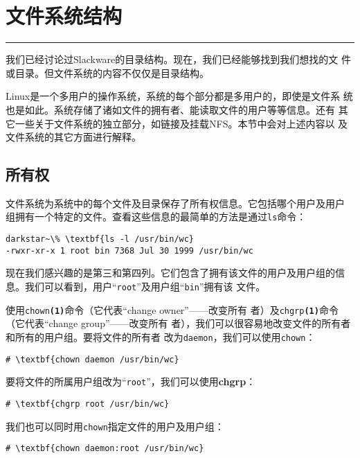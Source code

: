 
\chapter{文件系统结构}
\label{chap:filesystemStructure}

\rule{\textwidth}{0.1pt}

我们已经讨论过Slackware的目录结构。现在，我们已经能够找到我们想找的文
件或目录。但文件系统的内容不仅仅是目录结构。

Linux是一个多用户的操作系统，系统的每个部分都是多用户的，即使是文件系
统也是如此。系统存储了诸如文件的拥有者、能读取文件的用户等等信息。还有
其它一些关于文件系统的独立部分，如链接及挂载NFS。本节中会对上述内容以
及文件系统的其它方面进行解释。

\section{所有权}
\label{sec:filesystemStructure:owenership}
文件系统为系统中的每个文件及目录保存了所有权信息。它包括哪个用户及用户
组拥有一个特定的文件。查看这些信息的最简单的方法是通过\texttt{ls}命令：
\begin{Verbatim}[frame=single, commandchars=\\\{\}]
darkstar~\% \textbf{ls -l /usr/bin/wc}
-rwxr-xr-x 1 root bin 7368 Jul 30 1999 /usr/bin/wc
\end{Verbatim}
现在我们感兴趣的是第三和第四列。它们包含了拥有该文件的用户及用户组的信
息。我们可以看到，用户``\texttt{root}''及用户组``\texttt{bin}''拥有该
文件。

使用\texttt{chown\textbf{(1)}}命令（它代表``change owner''——改变所有
者）及\texttt{chgrp\textbf{(1)}}命令（它代表``change group''——改变所有
者），我们可以很容易地改变文件的所有者和所有的用户组。要将文件的所有者
改为\texttt{daemon}，我们可以使用\texttt{chown}：
\begin{Verbatim}[frame=single, commandchars=\\\{\}]
# \textbf{chown daemon /usr/bin/wc}
\end{Verbatim}
要将文件的所属用户组改为``\texttt{root}''，我们可以使用\textbf{chgrp}：
\begin{Verbatim}[frame=single, commandchars=\\\{\}]
# \textbf{chgrp root /usr/bin/wc}
\end{Verbatim}

我们也可以同时用\texttt{chown}指定文件的用户及用户组：
\begin{Verbatim}[frame=single, commandchars=\\\{\}]
# \textbf{chown daemon:root /usr/bin/wc}
\end{Verbatim}

